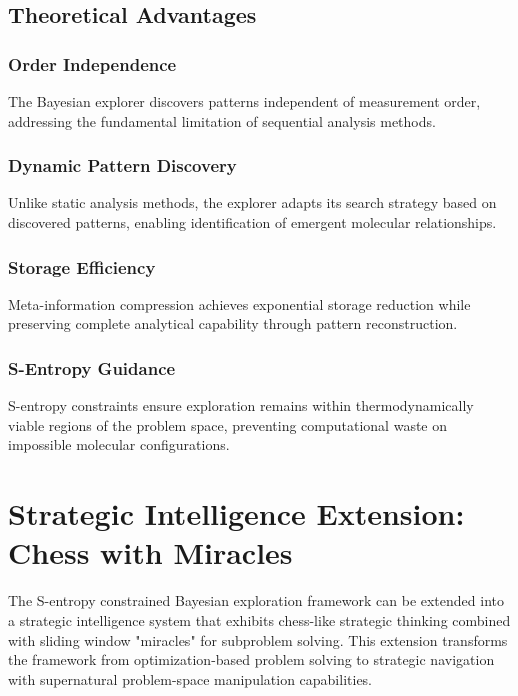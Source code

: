 \documentclass[12pt,a4paper]{article}
\begin{document}
\subsection{Theoretical Advantages}

\subsubsection{Order Independence}

The Bayesian explorer discovers patterns independent of measurement order, addressing the fundamental limitation of sequential analysis methods.

\subsubsection{Dynamic Pattern Discovery}

Unlike static analysis methods, the explorer adapts its search strategy based on discovered patterns, enabling identification of emergent molecular relationships.

\subsubsection{Storage Efficiency}

Meta-information compression achieves exponential storage reduction while preserving complete analytical capability through pattern reconstruction.

\subsubsection{S-Entropy Guidance}

S-entropy constraints ensure exploration remains within thermodynamically viable regions of the problem space, preventing computational waste on impossible molecular configurations.

\section{Strategic Intelligence Extension: Chess with Miracles}

The S-entropy constrained Bayesian exploration framework can be extended into a strategic intelligence system that exhibits chess-like strategic thinking combined with sliding window "miracles" for subproblem solving. This extension transforms the framework from optimization-based problem solving to strategic navigation with supernatural problem-space manipulation capabilities.
\end{document}
